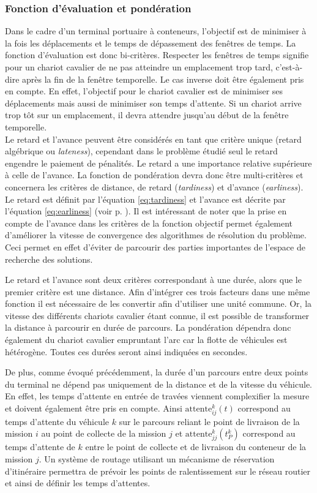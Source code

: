 \subsubsection{Fonction d'évaluation et pondération}
Dans le cadre d'un terminal portuaire à conteneurs, l'objectif est de minimiser à la fois les déplacements et le temps de dépassement des fenêtres de temps. 
La fonction d'évaluation est donc bi-critères. 
Respecter les fenêtres de temps signifie pour un chariot cavalier de ne pas atteindre un emplacement trop tard, c'est-à-dire après la fin de la fenêtre temporelle. 
Le cas inverse doit être également pris en compte. En effet, l'objectif pour le chariot cavalier est de minimiser ses déplacements mais aussi de minimiser son temps d'attente. Si un chariot arrive trop tôt sur un emplacement, il devra attendre jusqu'au début de la fenêtre temporelle.\\

Le retard et l'avance peuvent être considérés en tant que critère unique (retard algébrique ou \textit{lateness}), cependant dans le problème étudié seul le retard engendre le paiement de pénalités. Le retard a une importance relative supérieure à celle de l'avance. 
La fonction de pondération devra donc être multi-critères et concernera les critères de distance, de retard (\textit{tardiness}) et d'avance (\textit{earliness}). 
Le retard est définit par l'équation \ref{eq:tardiness} et l'avance est décrite par l'équation \ref{eq:earliness} (voir p. \pageref{eq:earliness}).
Il est intéressant de noter que la prise en compte de l'avance dans les critères de la fonction objectif permet également d'améliorer la vitesse de convergence des algorithmes de résolution du problème. Ceci permet en effet d'éviter de parcourir des parties importantes de l'espace de recherche des solutions.


Le retard et l'avance sont deux critères correspondant à une durée, alors que le premier critère est une distance. Afin d'intégrer ces trois facteurs dans une même fonction il est nécessaire de les convertir afin d'utiliser une unité commune. Or, la vitesse des différents chariots cavalier étant connue, il est possible de transformer la distance à parcourir en durée de parcours. La pondération dépendra donc également du chariot cavalier empruntant l'arc car la flotte de véhicules est hétérogène.
Toutes ces durées seront ainsi indiquées en secondes.

De plus, comme évoqué précédemment, la durée d'un parcours entre deux points du terminal ne dépend pas uniquement de la distance et de la vitesse du véhicule. 
En effet, les temps d'attente en entrée de travées viennent complexifier la mesure et doivent également être pris en compte. Ainsi $\text{attente}^k_{ij}(t)$ correspond au temps d'attente du véhicule $k$ sur le parcours reliant le point de livraison de la mission $i$ au point de collecte de la mission $j$ et $\text{attente}^k_{jj}(t^k_P)$ correspond au temps d'attente de $k$ entre le point de collecte et de livraison du conteneur de la mission $j$.
Un système de routage utilisant un mécanisme de réservation d'itinéraire permettra de prévoir les points de ralentissement sur le réseau routier et ainsi de définir les temps d'attentes.

